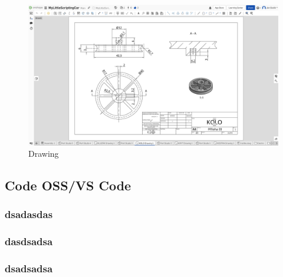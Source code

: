 \documentclass[12pt]{article}
\begin{document}
\begin{spacing}{1.5}
	\begin{figure}[h]
		\centering
		\includegraphics[width=\linewidth]{images/drawing_studio.png}
		\caption{Drawing}
		\label{fig:drawing_studio}
	\end{figure}
	
	\subsection{Code OSS/VS Code}
	\subsubsection{dsadasdas}
	\subsubsection{dasdsadsa}
	\subsubsection{dsadsadsa}
	
\end{spacing}
\end{document}

